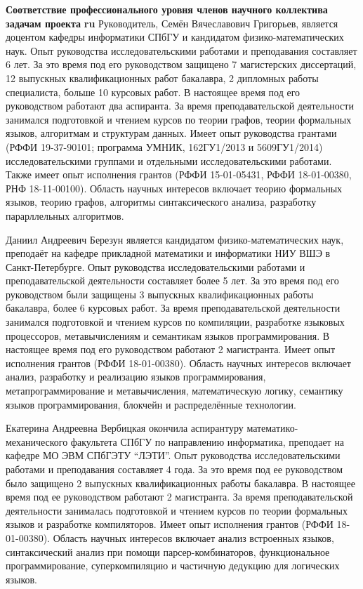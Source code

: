 \documentclass[12pt]{article}  %
\theoremstyle{remark}
\begin{document}
\textbf{Соответствие профессионального уровня членов научного коллектива задачам проекта}
\textbf{ru}
Руководитель, Семён Вячеславович Григорьев, является доцентом кафедры информатики СПбГУ и кандидатом физико-математических наук.
Опыт руководства исследовательскими работами и преподавания составляет 6 лет.
За это время под его руководством защищено 7 магистерских диссертаций, 12 выпускных квалификационных работ бакалавра, 2 дипломных работы специалиста, больше 10 курсовых работ.
В настоящее время под его руководством работают два аспиранта.
За время преподавательской деятельности занимался подготовкой и чтением курсов по теории графов, теории формальных языков, алгоритмам и структурам данных.
Имеет опыт руководства грантами (РФФИ 19-37-90101; программа УМНИК, 162ГУ1/2013 и 5609ГУ1/2014) исследовательскими группами и отдельными исследовательскими работами.
Также имеет опыт исполнения грантов (РФФИ 15-01-05431, РФФИ 18-01-00380, РНФ 18-11-00100).
Область научных интересов включает теорию формальных языков, теорию графов, алгоритмы синтаксического анализа, разработку парарллельных алгоритмов.

Даниил Андреевич Березун является кандидатом физико-математических наук, преподаёт на кафедре прикладной математики и информатики НИУ ВШЭ в Санкт-Петербурге.
Опыт руководства исследовательскими работами и преподавательской деятельности составляет более 5 лет.
За это время под его руководством были защищены 3 выпускных квалификационных работы бакалавра, более 6 курсовых работ.
За время преподавательской деятельности занимался подготовкой и чтением курсов по компиляции, разработке языковых процессоров, метавычислениям и семантикам языков программирования.
В настоящее время под его руководством работают 2 магистранта.
Имеет опыт исполнения грантов (РФФИ 18-01-00380).
Область научных интересов включает анализ, разработку и реализацию языков программирования,  метапрограммирование и метавычисления, математическую логику, семантику языков программирования, блокчейн и распределённые технологии.

Екатерина Андреевна Вербицкая окончила аспирантуру математико-механического факультета СПбГУ по направлению информатика, преподает на кафедре МО ЭВМ СПбГЭТУ ``ЛЭТИ''.
Опыт руководства исследовательскими работами и преподавания составляет 4 года.
За это время под ее руководством было защищено 2 выпускных квалификационных работы бакалавра.
В настоящее время под ее руководством работают 2 магистранта.
За время преподавательской деятельности занималась подготовкой и чтением курсов по теории формальных языков и разработке компиляторов.
Имеет опыт исполнения грантов (РФФИ 18-01-00380).
Область научных интересов включает анализ встроенных языков, синтаксический анализ при помощи парсер-комбинаторов, функциональное программирование, суперкомпиляцию и частичную дедукцию для логических языков.
\end{document}
